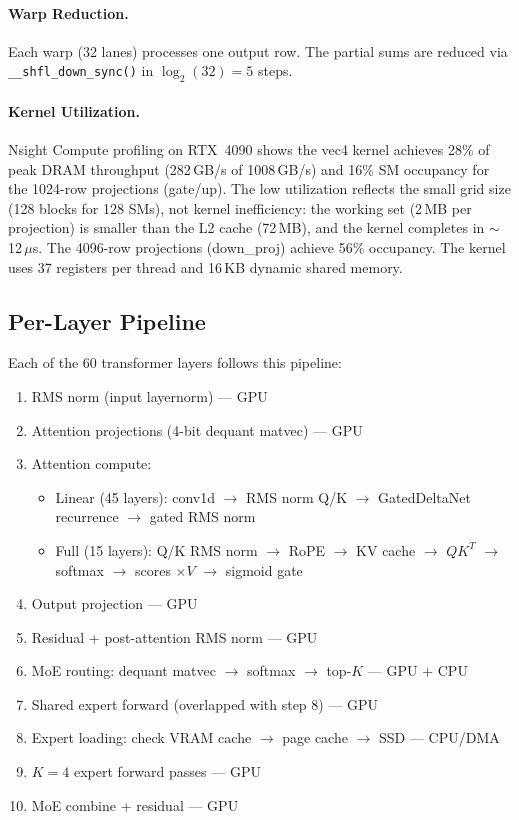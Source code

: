 \documentclass[11pt]{article}
\begin{document}
\paragraph{Warp Reduction.} Each warp (32 lanes) processes one output row. The partial sums are reduced via \texttt{\_\_shfl\_down\_sync()} in $\log_2(32) = 5$ steps.

\paragraph{Kernel Utilization.} Nsight Compute profiling on RTX~4090 shows the vec4 kernel achieves 28\% of peak DRAM throughput (282\,GB/s of 1008\,GB/s) and 16\% SM occupancy for the 1024-row projections (gate/up). The low utilization reflects the small grid size (128 blocks for 128 SMs), not kernel inefficiency: the working set (2\,MB per projection) is smaller than the L2 cache (72\,MB), and the kernel completes in $\sim$12\,$\mu$s. The 4096-row projections (down\_proj) achieve 56\% occupancy. The kernel uses 37 registers per thread and 16\,KB dynamic shared memory.

\subsection{Per-Layer Pipeline}

Each of the 60 transformer layers follows this pipeline:

\begin{enumerate}[nosep]
    \item RMS norm (input layernorm) --- GPU
    \item Attention projections (4-bit dequant matvec) --- GPU
    \item Attention compute:
    \begin{itemize}[nosep]
        \item Linear (45 layers): conv1d $\to$ RMS norm Q/K $\to$ GatedDeltaNet recurrence $\to$ gated RMS norm
        \item Full (15 layers): Q/K RMS norm $\to$ RoPE $\to$ KV cache $\to$ $Q K^T$ $\to$ softmax $\to$ scores $\times V$ $\to$ sigmoid gate
    \end{itemize}
    \item Output projection --- GPU
    \item Residual + post-attention RMS norm --- GPU
    \item MoE routing: dequant matvec $\to$ softmax $\to$ top-$K$ --- GPU + CPU
    \item Shared expert forward (overlapped with step 8) --- GPU
    \item Expert loading: check VRAM cache $\to$ page cache $\to$ SSD --- CPU/DMA
    \item $K=4$ expert forward passes --- GPU
    \item MoE combine + residual --- GPU
\end{enumerate}
\end{document}
